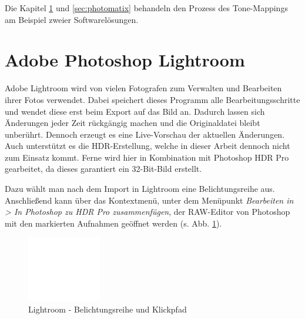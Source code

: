 \documentclass[liststotoc,bibtotoc,fontsize=14pt,]{scrreprt}
\begin{document}
		\bigskip
		Die Kapitel \ref{sec:photoshop} und \ref{sec:photomatix} behandeln den Prozess des Tone-Mappings am Beispiel zweier Softwarelösungen.

	
	\section{Adobe Photoshop Lightroom}
	\label{sec:photoshop}
		Adobe Lightroom wird von vielen Fotografen zum Verwalten und Bearbeiten ihrer Fotos verwendet. Dabei speichert dieses Programm alle Bearbeitungsschritte und wendet diese erst beim Export auf das Bild an. Dadurch lassen sich Änderungen jeder Zeit rückgängig machen und die Originaldatei bleibt unberührt. Dennoch erzeugt es eine Live-Vorschau der aktuellen Änderungen. Auch unterstützt es die HDR-Erstellung, welche in dieser Arbeit dennoch nicht zum Einsatz kommt. Ferne wird hier in Kombination mit Photoshop HDR Pro gearbeitet, da dieses garantiert ein 32-Bit-Bild erstellt.
		
		\bigskip
		Dazu wählt man nach dem Import in Lightroom eine Belichtungsreihe aus. Anschließend kann über das Kontextmenü, unter dem Menüpunkt \textit{Bearbeiten in > In Photoshop zu HDR Pro zusammenfügen}, der RAW-Editor von Photoshop mit den markierten Aufnahmen geöffnet werden (s. Abb. \ref{img:light_1}).
		
		\bigskip
		\begin{figure}[H]
			\includegraphics[width=\linewidth]{img/ph2.jpg}
			\caption{Lightroom - Belichtungsreihe und Klickpfad}
			\label{img:light_1}
		\end{figure}
	
\end{document}
